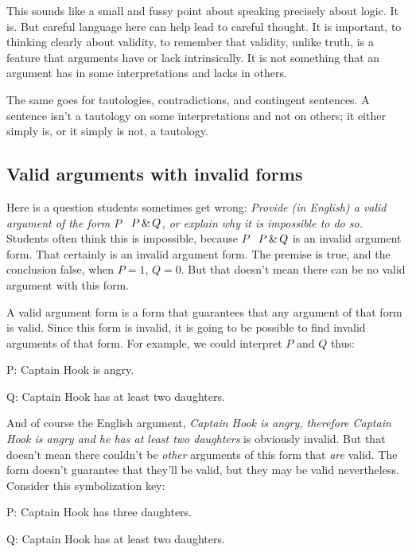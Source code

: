 This sounds like a small and fussy point about speaking precisely about logic. It is. But careful language here can help lead to careful thought. It is important, to thinking clearly about validity, to remember that validity, unlike truth, is a feature that arguments have or lack intrinsically. It is not something that an argument has in some interpretations and lacks in others.

The same goes for tautologies, contradictions, and contingent sentences. A sentence isn't a tautology on some interpretations and not on others; it either simply is, or it simply is not, a tautology.

\subsection{Valid arguments with invalid forms}

Here is a question students sometimes get wrong: \emph{Provide (in English) a valid argument of the form $P$ \therefore\ $P \,\&\, Q$, or explain why it is impossible to do so.} Students often think this is impossible, because $P$ \therefore\ $P \,\&\, Q$ is an invalid argument form. That certainly is an invalid argument form. The premise is true, and the conclusion false, when $P=1$, $Q=0$. But that doesn't mean there can be no valid argument with this form.

A valid argument form is a form that guarantees that any argument of that form is valid. Since this form is invalid, it is going to be possible to find invalid arguments of that form. For example, we could interpret $P$ and $Q$ thus:

\begin{ekey}
\item[P:] Captain Hook is angry.
\item[Q:] Captain Hook has at least two daughters.
\end{ekey}

And of course the English argument, \emph{Captain Hook is angry, therefore Captain Hook is angry and he has at least two daughters} is obviously invalid. But that doesn't mean there couldn't be \emph{other} arguments of this form that \emph{are} valid. The form doesn't guarantee that they'll be valid, but they may be valid nevertheless. Consider this symbolization key:

\begin{ekey}
\item[P:] Captain Hook has three daughters.
\item[Q:] Captain Hook has at least two daughters.
\end{ekey}

